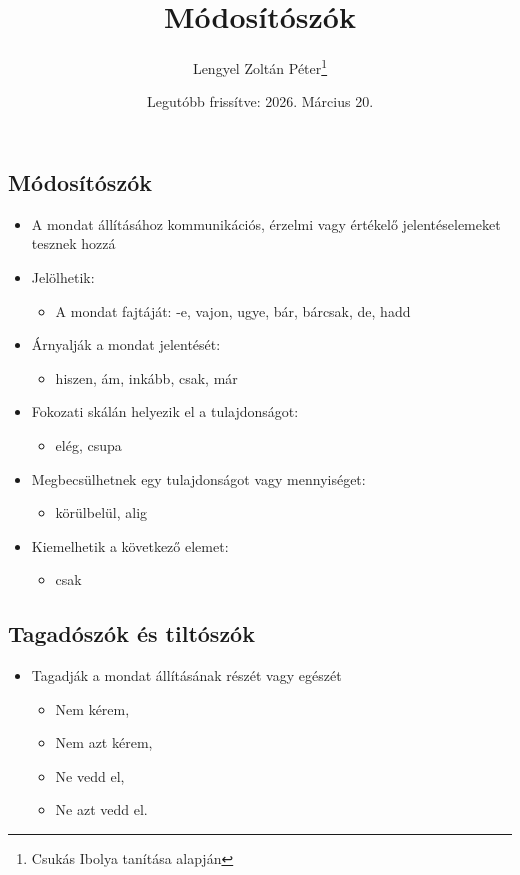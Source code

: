 \documentclass{article}
\title{Módosítószók}
\author{Lengyel Zoltán Péter\thanks{Csukás Ibolya tanítása alapján}}
\date{Legutóbb frissítve: 2026. Március 20.}
\begin{document}
\maketitle
\tableofcontents
\newpage

\begin{center}
    \section{Módosítószók}
\end{center}
\begin{itemize}
    \item A mondat állításához kommunikációs, érzelmi vagy értékelő jelentéselemeket tesznek hozzá
    
    \item Jelölhetik: 
    \begin{itemize}
        \item A mondat fajtáját: -e, vajon, ugye, bár, bárcsak, de, hadd
    \end{itemize}
    
    \item Árnyalják a mondat jelentését: \begin{itemize}
        \item hiszen, ám, inkább, csak, már
    \end{itemize}
    
    \item Fokozati skálán helyezik el a tulajdonságot: 
    \begin{itemize}
        \item elég, csupa
    \end{itemize}
    
    \item Megbecsülhetnek egy tulajdonságot vagy mennyiséget: 
    \begin{itemize}
        \item körülbelül, alig
    \end{itemize}
    
    \item Kiemelhetik a következő elemet: \begin{itemize}
        \item csak
    \end{itemize}
\end{itemize}

\subsection{Tagadószók és tiltószók}
\begin{itemize}
    \item Tagadják a mondat állításának részét vagy egészét
    \begin{itemize}
        \item Nem kérem,
        \item Nem azt kérem,
        \item Ne vedd el,
        \item Ne azt vedd el.
    \end{itemize}
    
\end{itemize}
\end{document}
